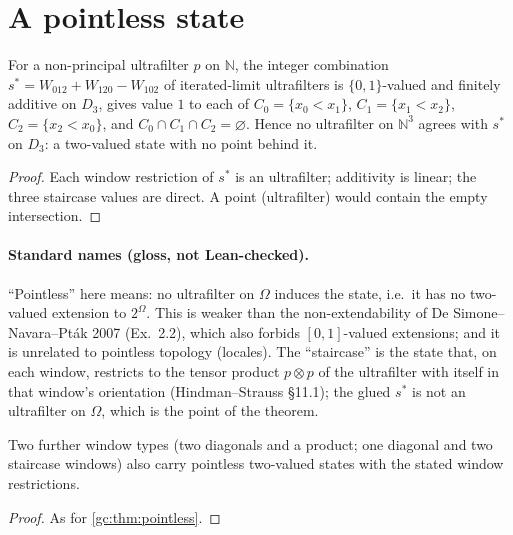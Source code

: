 \section{A pointless state}

\begin{theorem}
\label{gc:thm:pointless}
\leanok
{}
For a non-principal ultrafilter $p$ on $\mathbb N$, the integer combination
$s^*=W_{012}+W_{120}-W_{102}$ of iterated-limit ultrafilters is $\{0,1\}$-valued
and finitely additive on $D_3$, gives value $1$ to each of
$C_0=\{x_0<x_1\}$, $C_1=\{x_1<x_2\}$, $C_2=\{x_2<x_0\}$, and
$C_0\cap C_1\cap C_2=\varnothing$. Hence no ultrafilter on $\mathbb N^3$ agrees
with $s^*$ on $D_3$: a two-valued state with no point behind it.
\end{theorem}
\begin{proof}
\leanok
Each window restriction of $s^*$ is an ultrafilter; additivity is linear; the
three staircase values are direct. A point (ultrafilter) would contain the empty
intersection.
\end{proof}

\paragraph{Standard names (gloss, not Lean-checked).} ``Pointless'' here means:
no ultrafilter on $\Omega$ induces the state, i.e.\ it has no two-valued
extension to $2^\Omega$. This is weaker than the non-extendability of De
Simone--Navara--Pt\'ak 2007 (Ex.~2.2), which also forbids $[0,1]$-valued
extensions; and it is unrelated to pointless topology (locales). The
``staircase'' is the state that, on each window, restricts to the tensor product
$p\otimes p$ of the ultrafilter with itself in that window's orientation
(Hindman--Strauss \S11.1); the glued $s^*$ is not an ultrafilter on $\Omega$,
which is the point of the theorem.

\begin{theorem}
\label{gc:thm:ddp}
\leanok
{}
Two further window types (two diagonals and a product; one diagonal and two
staircase windows) also carry pointless two-valued states with the stated window
restrictions.
\end{theorem}
\begin{proof}
\leanok
As for \ref{gc:thm:pointless}.
\end{proof}

